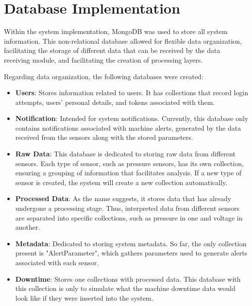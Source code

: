 \section[Database Implementation]{Database Implementation}

Within the system implementation, MongoDB was used to store all system information. This non-relational database allowed for flexible data organization, facilitating the storage of different data that can be received by the data receiving module, and facilitating the creation of processing layers.

Regarding data organization, the following databases were created:

\begin{itemize}
    \item \textbf{Users}: Stores information related to users. It has collections that record login attempts, users' personal details, and tokens associated with them.
    
    \item \textbf{Notification}: Intended for system notifications. Currently, this database only contains notifications associated with machine alerts, generated by the data received from the sensors along with the stored parameters.
    
    \item \textbf{Raw Data}: This database is dedicated to storing raw data from different sensors. Each type of sensor, such as pressure sensors, has its own collection, ensuring a grouping of information that facilitates analysis. If a new type of sensor is created, the system will create a new collection automatically.
    
    \item \textbf{Processed Data}: As the name suggests, it stores data that has already undergone a processing stage. Thus, interpreted data from different sensors are separated into specific collections, such as pressure in one and voltage in another.
    
    \item \textbf{Metadata}: Dedicated to storing system metadata. So far, the only collection present is "AlertParameter", which gathers parameters used to generate alerts associated with each sensor.
    
    \item \textbf{Downtime}: Stores one collections with processed data. This database with this collection is only to simulate what the machine downtime data would look like if they were inserted into the system.
\end{itemize}

